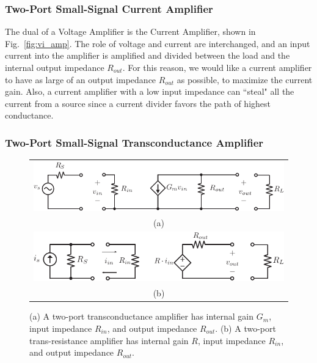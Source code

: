 \subsubsection{Two-Port Small-Signal Current Amplifier}

The dual of a Voltage Amplifier is the Current Amplifier, shown in Fig.~\ref{fig:vi_amp}.  The role of voltage and current are interchanged, and an input current into the amplifier is amplified and divided between the load and the internal output impedance $R_{out}$.  For this reason, we would like a current amplifier to have as large of an output impedance $R_{out}$ as possible, to maximize the current gain.  Also, a current amplifier with a low input impedance can ``steal" all the current from a source since a current divider favors the path of highest conductance.


\subsubsection{Two-Port Small-Signal Transconductance Amplifier}

\begin{figure}[tb]
\begin{center}
\begin{tabular}{c}
\includegraphics[width=.7\columnwidth]{gmamp} \\
(a) \\
\includegraphics[width=.7\columnwidth]{ramp} \\
(b) \\
\end{tabular}
\end{center}
\caption{(a) A two-port transconductance amplifier has internal gain $G_m$, input impedance $R_{in}$, and output impedance $R_{out}$.  (b) A two-port trans-resistance amplifier has internal gain $R$, input impedance $R_{in}$, and output impedance $R_{out}$.} \label{fig:gm_z_amp}
\end{figure}


